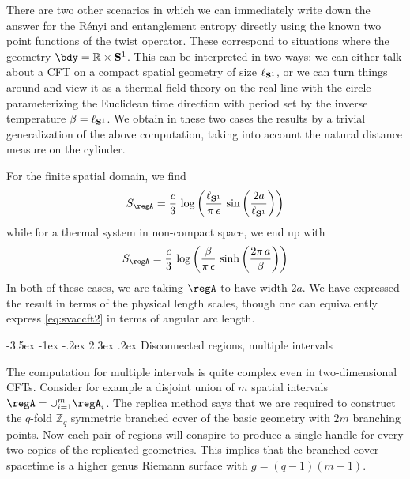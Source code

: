 \documentclass[12pt,openany]{book}
\makeatletter
\renewcommand\section{\@startsection {section}{1}{\z@}%
                                   {-3.5ex \@plus -1ex \@minus -.2ex}%
                                   {2.3ex \@plus.2ex}%
                                   {\normalfont\large\bfseries}}
\makeatother
\begin{document}
There are two other scenarios in which we can immediately write down the answer for the R\'enyi and entanglement entropy directly using the known two point functions of the twist operator. These correspond to situations where the geometry $\bdy = {\mathbb R}\times {\bf S}^1$. This can be interpreted in two ways: we can either talk about a CFT on a compact spatial geometry of size $\ell_{{\bf S}^1}$, or we can turn things around and view it as a thermal field theory on the real line with the circle parameterizing the Euclidean time direction with period set by the inverse temperature $\beta = \ell_{{\bf S}^1}$. We obtain in these two cases the results by a trivial generalization of the above computation, taking into account the natural distance measure on the cylinder.

For the finite spatial domain, we find
%
\begin{align}
S_\regA  = \frac{c}{3} \, \log \left(\frac{\ell_{{\bf S}^1}}{\pi \,\epsilon}\, \sin \left(\frac{2a}{\ell_{{\bf S}^1}}\right)\right)
\label{eq:svaccft2}
\end{align}
%
while for a thermal system in non-compact space, we end up with
%
\begin{equation}
S_\regA = \frac{c}{3} \, \log \left(\frac{\beta}{\pi \,\epsilon}\, \sinh \left(\frac{2\pi\,a}{\beta}\right)\right)
\label{eq:sthermcft2}
\end{equation}
%
In both of these cases, we are taking $\regA$ to have width $2 a$. We have expressed the result in terms of the physical  length scales, though one can equivalently express \eqref{eq:svaccft2} in terms of angular arc length.

\section{Disconnected regions, multiple intervals}

The computation for multiple intervals is quite complex even in two-dimensional CFTs.  Consider for example a disjoint union of $m$ spatial intervals $\regA = \cup_{i=1}^m \regA_i$. The replica method says that we are required to construct the $q$-fold ${\mathbb Z}_q$  symmetric branched cover of the basic geometry with $2m$ branching points. Now each pair of regions will conspire to produce a single handle for every two copies of the replicated geometries. This implies that the branched cover spacetime is a higher genus Riemann surface with $g = (q-1)(m-1)$.
\end{document}
